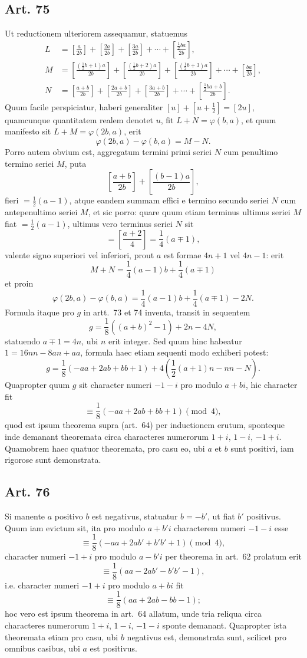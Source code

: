 \documentclass[12pt]{article}
\newcommand{\art}[1]{\subsection*{Art. #1}}
\newcommand{\gbrack}[1]{\left[#1\right]}
\begin{document}
\art{75}
Ut reductionem ulteriorem assequamur, statuemus
\[
\begin{aligned}
L&=\gbrack{\frac{a}{2b}}+\gbrack{\frac{2a}{2b}}+\gbrack{\frac{3a}{2b}}+\cdots+\gbrack{\frac{\frac12ba}{2b}},\\
M&=\gbrack{\frac{(\frac12b+1)a}{2b}}+\gbrack{\frac{(\frac12b+2)a}{2b}}+\gbrack{\frac{(\frac12b+3)a}{2b}}+\cdots+\gbrack{\frac{ba}{2b}},\\
N&=\gbrack{\frac{a+b}{2b}}+\gbrack{\frac{2a+b}{2b}}+\gbrack{\frac{3a+b}{2b}}+\cdots+\gbrack{\frac{\frac12ba+b}{2b}}.
\end{aligned}
\]
Quum facile perspiciatur, haberi generaliter $[u]+\left[u+\frac12\right]=[2u]$, quamcunque quantitatem realem denotet $u$, fit $L+N=\varphi(b,a)$, et quum manifesto sit $L+M=\varphi(2b,a)$, erit
\[
\varphi(2b,a)-\varphi(b,a)=M-N.
\]
Porro autem obvium est, aggregatum termini primi seriei $N$ cum penultimo termino seriei $M$, puta
\[
\gbrack{\frac{a+b}{2b}}+\gbrack{\frac{(b-1)a}{2b}},
\]
fieri $=\frac12(a-1)$, atque eandem summam effici e termino secundo seriei $N$ cum antepenultimo seriei $M$, et sic porro: quare quum etiam terminus ultimus seriei $M$ fiat $=\frac12(a-1)$, ultimus vero terminus seriei $N$ sit
\[
=\gbrack{\frac{a+2}{4}}=\frac14(a\mp1),
\]
valente signo superiori vel inferiori, prout $a$ est formae $4n+1$ vel $4n-1$: erit
\[
M+N=\frac14(a-1)b+\frac14(a\mp1)
\]
et proin
\[
\varphi(2b,a)-\varphi(b,a)=\frac14(a-1)b+\frac14(a\mp1)-2N.
\]
Formula itaque pro $g$ in artt.~73 et 74 inventa, transit in sequentem
\[
g=\frac18((a+b)^2-1)+2n-4N,
\]
statuendo $a\mp1=4n$, ubi $n$ erit integer. Sed quum hinc habeatur $1=16nn-8an+aa$, formula haec etiam sequenti modo exhiberi potest:
\[
g=\frac18(-aa+2ab+bb+1)+4\left(\frac12(a+1)n-nn-N\right).
\]
Quapropter quum $g$ sit character numeri $-1-i$ pro modulo $a+bi$, hic character fit
\[
\equiv \frac18(-aa+2ab+bb+1)\pmod4,
\]
quod est ipsum theorema supra (art.~64) per inductionem erutum, sponteque inde demanant theoremata circa characteres numerorum $1+i$, $1-i$, $-1+i$. Quamobrem haec quatuor theoremata, pro casu eo, ubi $a$ et $b$ sunt positivi, iam rigorose sunt demonstrata.

\art{76}
Si manente $a$ positivo $b$ est negativus, statuatur $b=-b'$, ut fiat $b'$ positivus. Quum iam evictum sit, ita pro modulo $a+b'i$ characterem numeri $-1-i$ esse
\[
\equiv \frac18(-aa+2ab'+b'b'+1)\pmod4,
\]
character numeri $-1+i$ pro modulo $a-b'i$ per theorema in art.~62 prolatum erit
\[
\equiv \frac18(aa-2ab'-b'b'-1),
\]
i.e. character numeri $-1+i$ pro modulo $a+bi$ fit
\[
\equiv \frac18(aa+2ab-bb-1);
\]
hoc vero est ipsum theorema in art.~64 allatum, unde tria reliqua circa characteres numerorum $1+i$, $1-i$, $-1-i$ sponte demanant. Quapropter ista theoremata etiam pro casu, ubi $b$ negativus est, demonstrata sunt, scilicet pro omnibus casibus, ubi $a$ est positivus.
\end{document}
